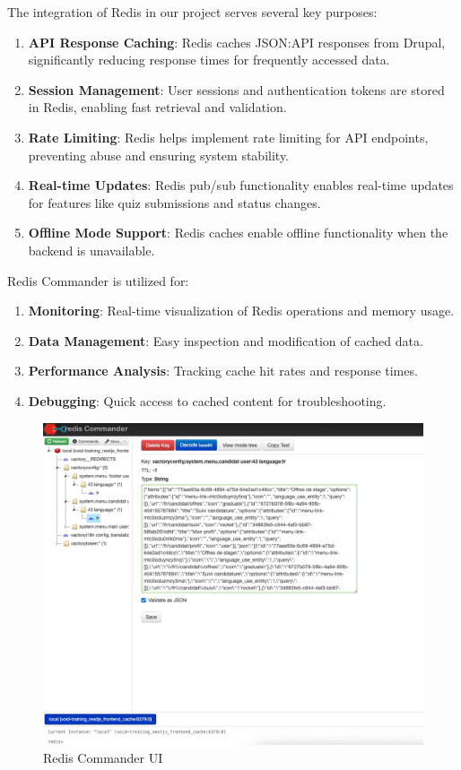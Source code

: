 The integration of Redis in our project serves several key purposes:

\begin{enumerate}
    \item \textbf{API Response Caching}: Redis caches JSON:API responses from Drupal, significantly reducing response times for frequently accessed data.
    \item \textbf{Session Management}: User sessions and authentication tokens are stored in Redis, enabling fast retrieval and validation.
    \item \textbf{Rate Limiting}: Redis helps implement rate limiting for API endpoints, preventing abuse and ensuring system stability.
    \item \textbf{Real-time Updates}: Redis pub/sub functionality enables real-time updates for features like quiz submissions and status changes.
    \item \textbf{Offline Mode Support}: Redis caches enable offline functionality when the backend is unavailable.
\end{enumerate}

Redis Commander is utilized for:
\begin{enumerate}
    \item \textbf{Monitoring}: Real-time visualization of Redis operations and memory usage.
    \item \textbf{Data Management}: Easy inspection and modification of cached data.
    \item \textbf{Performance Analysis}: Tracking cache hit rates and response times.
    \item \textbf{Debugging}: Quick access to cached content for troubleshooting.
\end{enumerate}

\begin{figure}[H]
    \centering
    \includegraphics[width=\textwidth]{images/redisCommander.png}
    \caption{Redis Commander UI}
    \label{fig:redis_commander}
\end{figure}

